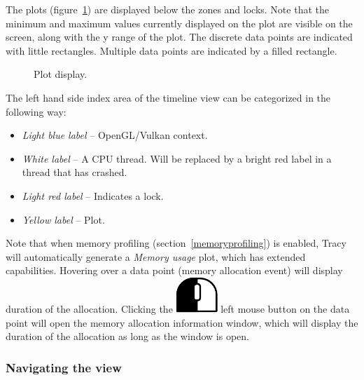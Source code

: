 \documentclass[hidelinks,titlepage,a4paper]{article}
\newcommand{\LMB}{\includegraphics[height=.8\baselineskip]{icons/lmb}}
\begin{document}
The plots (figure~\ref{plot}) are displayed below the zones and locks. Note that the minimum and maximum values currently displayed on the plot are visible on the screen, along with the y range of the plot. The discrete data points are indicated with little rectangles. Multiple data points are indicated by a filled rectangle.

\begin{figure}[h]
\centering{}
\caption{Plot display.}
\label{plot}
\end{figure}

The left hand side index area of the timeline view can be categorized in the following way:

\begin{itemize}
\item \emph{Light blue label} -- OpenGL/Vulkan context.
\item \emph{White label} -- A CPU thread. Will be replaced by a bright red label in a thread that has crashed.
\item \emph{Light red label} -- Indicates a lock.
\item \emph{Yellow label} -- Plot.
\end{itemize}

Note that when memory profiling (section~\ref{memoryprofiling}) is enabled, Tracy will automatically generate a \emph{\faMemory{} Memory usage} plot, which has extended capabilities. Hovering over a data point (memory allocation event) will display duration of the allocation. Clicking the \LMB{} left mouse button on the data point will open the memory allocation information window, which will display the duration of the allocation as long as the window is open.

\subsubsection{Navigating the view}
\end{document}
